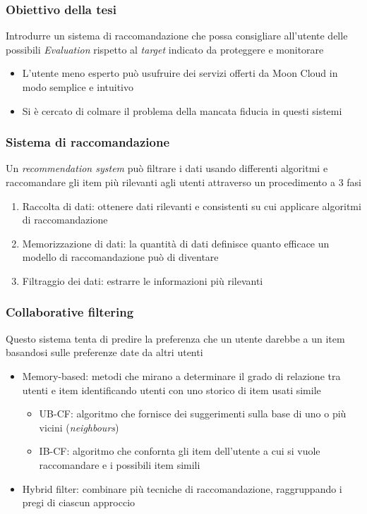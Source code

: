 \begin{frame}
    \frametitle{Obiettivo della tesi}
    Introdurre un \alert{sistema di raccomandazione} che possa consigliare all'utente delle possibili \textit{Evaluation} rispetto 
    al \textit{target} indicato da proteggere e monitorare
    \begin{itemize}
        \item L'utente meno esperto può usufruire dei servizi offerti da Moon Cloud in modo \alert{semplice} e \alert{intuitivo}
        \item Si è cercato di colmare il problema della mancata fiducia in questi sistemi
    \end{itemize}
\end{frame}

\begin{frame}
    \frametitle{Sistema di raccomandazione}
    Un \textit{recommendation system} può filtrare i dati usando differenti algoritmi e raccomandare gli item più rilevanti agli utenti attraverso 
    un procedimento a 3 fasi
    \begin{enumerate}
        \item \alert{Raccolta di dati}: ottenere dati rilevanti e consistenti su cui applicare algoritmi di raccomandazione
        \item \alert{Memorizzazione di dati}: la quantità di dati definisce quanto efficace un modello di raccomandazione può di diventare
        \item \alert{Filtraggio dei dati}: estrarre le informazioni più rilevanti
    \end{enumerate}
\end{frame}

\begin{frame}
    \frametitle{Collaborative filtering}
    Questo sistema tenta di predire la preferenza che un utente darebbe a un item basandosi sulle preferenze date da altri 
    utenti
    \begin{itemize}
        \item Memory-based: metodi che mirano a determinare il grado di relazione tra utenti e item identificando 
        utenti con uno storico di item usati simile
            \begin{itemize}
                \item \alert{UB-CF}: algoritmo che fornisce dei suggerimenti sulla base di uno o più vicini (\textit{neighbours})
                \item \alert{IB-CF}: algoritmo che confornta gli item dell'utente a cui si vuole raccomandare e i possibili item simili
            \end{itemize}
        \item Hybrid filter: combinare più tecniche di raccomandazione, raggruppando i pregi di ciascun approccio
    \end{itemize}
\end{frame}

